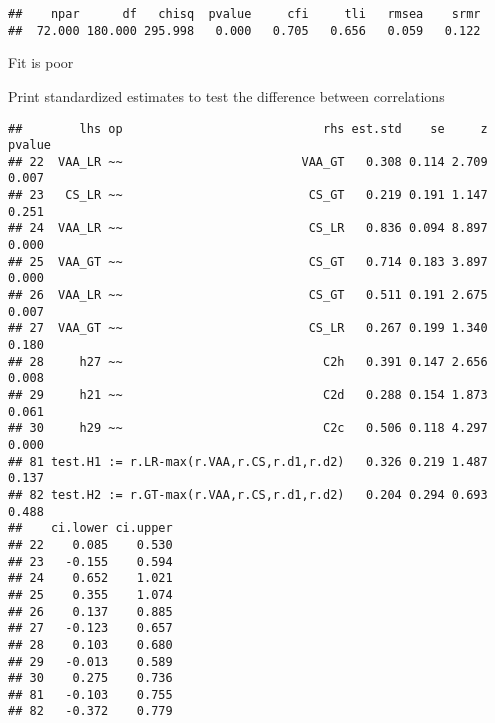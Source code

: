 \documentclass[
]{article}
\newenvironment{Shaded}{\begin{snugshade}}{\end{snugshade}}
\newcommand{\KeywordTok}[1]{\textcolor[rgb]{0.13,0.29,0.53}{\textbf{#1}}}
\newcommand{\NormalTok}[1]{#1}
\newcommand{\OperatorTok}[1]{\textcolor[rgb]{0.81,0.36,0.00}{\textbf{#1}}}
\newcommand{\StringTok}[1]{\textcolor[rgb]{0.31,0.60,0.02}{#1}}
\begin{document}
\begin{verbatim}
##    npar      df   chisq  pvalue     cfi     tli   rmsea    srmr 
##  72.000 180.000 295.998   0.000   0.705   0.656   0.059   0.122
\end{verbatim}

Fit is poor

Print standardized estimates to test the difference between correlations

\begin{Shaded}
\end{Shaded}

\begin{verbatim}
##        lhs op                            rhs est.std    se     z pvalue
## 22  VAA_LR ~~                         VAA_GT   0.308 0.114 2.709  0.007
## 23   CS_LR ~~                          CS_GT   0.219 0.191 1.147  0.251
## 24  VAA_LR ~~                          CS_LR   0.836 0.094 8.897  0.000
## 25  VAA_GT ~~                          CS_GT   0.714 0.183 3.897  0.000
## 26  VAA_LR ~~                          CS_GT   0.511 0.191 2.675  0.007
## 27  VAA_GT ~~                          CS_LR   0.267 0.199 1.340  0.180
## 28     h27 ~~                            C2h   0.391 0.147 2.656  0.008
## 29     h21 ~~                            C2d   0.288 0.154 1.873  0.061
## 30     h29 ~~                            C2c   0.506 0.118 4.297  0.000
## 81 test.H1 := r.LR-max(r.VAA,r.CS,r.d1,r.d2)   0.326 0.219 1.487  0.137
## 82 test.H2 := r.GT-max(r.VAA,r.CS,r.d1,r.d2)   0.204 0.294 0.693  0.488
##    ci.lower ci.upper
## 22    0.085    0.530
## 23   -0.155    0.594
## 24    0.652    1.021
## 25    0.355    1.074
## 26    0.137    0.885
## 27   -0.123    0.657
## 28    0.103    0.680
## 29   -0.013    0.589
## 30    0.275    0.736
## 81   -0.103    0.755
## 82   -0.372    0.779
\end{verbatim}
\end{document}
